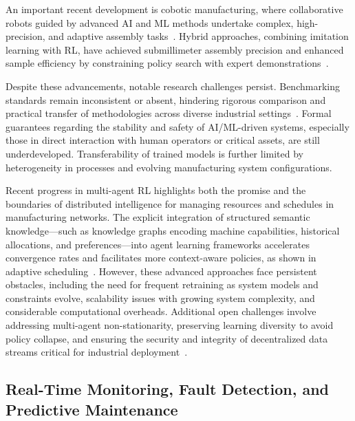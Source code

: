 \documentclass[sigconf]{acmart}
\begin{document}
An important recent development is cobotic manufacturing, where collaborative robots guided by advanced AI and ML methods undertake complex, high-precision, and adaptive assembly tasks~\cite{ref42,ref44,ref45}. Hybrid approaches, combining imitation learning with RL, have achieved submillimeter assembly precision and enhanced sample efficiency by constraining policy search with expert demonstrations~\cite{ref44}.

Despite these advancements, notable research challenges persist. Benchmarking standards remain inconsistent or absent, hindering rigorous comparison and practical transfer of methodologies across diverse industrial settings~\cite{ref56}. Formal guarantees regarding the stability and safety of AI/ML-driven systems, especially those in direct interaction with human operators or critical assets, are still underdeveloped. Transferability of trained models is further limited by heterogeneity in processes and evolving manufacturing system configurations.

Recent progress in multi-agent RL highlights both the promise and the boundaries of distributed intelligence for managing resources and schedules in manufacturing networks. The explicit integration of structured semantic knowledge---such as knowledge graphs encoding machine capabilities, historical allocations, and preferences---into agent learning frameworks accelerates convergence rates and facilitates more context-aware policies, as shown in adaptive scheduling~\cite{ref13,ref14}. However, these advanced approaches face persistent obstacles, including the need for frequent retraining as system models and constraints evolve, scalability issues with growing system complexity, and considerable computational overheads. Additional open challenges involve addressing multi-agent non-stationarity, preserving learning diversity to avoid policy collapse, and ensuring the security and integrity of decentralized data streams critical for industrial deployment~\cite{ref13,ref14,ref45,ref56}.

\subsection{Real-Time Monitoring, Fault Detection, and Predictive Maintenance}
\end{document}
